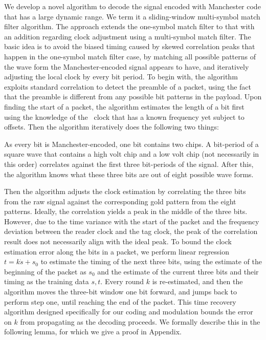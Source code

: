 We develop a novel algorithm to decode the signal encoded with Manchester code that has a large dynamic range. We term it a sliding-window multi-symbol match filter algorithm. The approach extends the one-symbol match filter to that with an addition regarding clock adjustment using a multi-symbol match filter. The basic idea is to avoid the biased timing caused by skewed correlation peaks that happen in the one-symbol match filter case, by matching all possible patterns of the wave form the Manchester-encoded signal appears to have, and iteratively adjusting the local clock by every bit period. To begin with, the algorithm exploits standard correlation to detect the preamble of a packet, using the fact that the preamble is different from any possible bit patterns in the payload. Upon finding the start of a packet, the algorithm estimates the length of a bit first using the knowledge of the \vitag\ clock that has a known frequency yet subject to offsets. Then the algorithm iteratively does the following two things:

\vskip 0.05in As every bit is Manchester-encoded, one bit contains two chips. A bit-period of a square wave that contains a high volt chip and a low volt chip (not necessarily in this order) correlates against the first three bit-periods of the signal. After this, the algorithm knows what these three bits are out of eight possible wave forms.

\vskip 0.05in Then the algorithm adjusts the clock estimation by correlating the three bits from the raw signal against the corresponding gold pattern from the eight patterns. Ideally, the correlation yields a peak in the middle of the three bits. However, due to the time variance with the start of the packet and the frequency deviation between the reader clock and the tag clock, the peak of the correlation result does not necessarily align with the ideal peak. To bound the clock estimation error along the bits in a packet, we perform linear regression $t=k\dot s+s_0$ to estimate the timing of the next three bits, using the estimate of the beginning of the packet as $s_0$ and the estimate of the current three bits and their timing as the training data ${s,t}$. Every round $k$ is re-estimated, and then the algorithm moves the three-bit window one bit forward, and jumps back to perform step one, until reaching the end of the packet. This time recovery algorithm designed specifically for our coding and modulation bounds the error on $k$ from propagating as the decoding proceeds. We formally describe this in the following lemma, for which we give a proof in Appendix.


